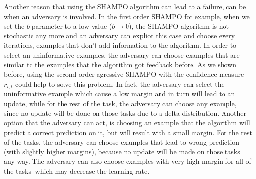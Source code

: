 Another reason that using the SHAMPO algorithm can lead to a failure, can be 
when an adversary is involved. In the first order SHAMPO for example, when we 
set the $b$ parameter to a low value ($b \rightarrow 0$), the SHAMPO algorithm 
is not stochastic any more and an adversary can expliot this case and choose 
every iterations, examples that don't add information to the algorithm. In order to select an uninformative 
examples, the adversary can choose  examples that are similar to the examples 
that the algorithm got feedback before. As we shown before, using the second order agressive 
SHAMPO with the confidence measure $r_{i,t}$ could help to solve this problem.
 In fact, the adversary can select the 
uninformative example which cause a low margin and in turn will lead to an update, while for the rest 
of the task, the adversary can choose any example, since no update will be done on those 
tasks due to a delta distribution. Another option that the adversary can act, is 
choosing an example that the algorithm will predict a correct prediction on it, 
but will result with a small margin. For the rest of the tasks, the adversary 
can choose examples that lead to wrong prediction (with slightly higher margins), because no update will be 
made on those tasks any way. The adversary can also choose  examples with very high margin for all of the tasks, 
which may decrease the learning rate. 

